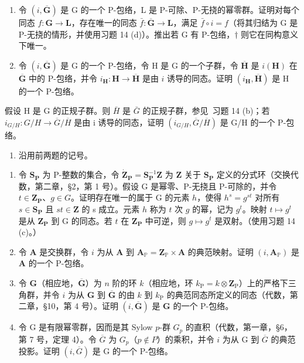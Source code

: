 \begin{enumerate}
\def\labelenumi{(\alph{enumi})}
\item
  令 \((i, \overline{\mathbf{G}})\) 是 G 的一个 P-包络，L 是 P-可除、P-无挠的幂零群。证明对每个同态 \(f\colon \mathbf{G} \to \mathbf{L}\)，存在唯一的同态 \(\bar{f}\colon \overline{\mathbf{G}} \to \mathbf{L}\)，满足 \(\bar{f} \circ i = f\)（将其归结为 G 是 P-无挠的情形，并使用习题 14 (d)）。推出若 G 有 P-包络，\(\dagger\) 则它在同构意义下唯一。
\item
  令 \((i, \overline{\mathbf{G}})\) 是 G 的一个 P-包络，令 H 是 G 的一个子群，令 \(\overline{\mathbf{H}}\) 是 \(i(\mathbf{H})\) 在 \(\overline{\mathbf{G}}\) 中的 P-包络，并令 \(i_{\mathbf{H}}: \mathbf{H} \to \overline{\mathbf{H}}\) 是由 \(i\) 诱导的同态。证明 \((i_{\mathbf{H}}, \overline{\mathbf{H}})\) 是 H 的一个 P-包络。
\end{enumerate}

假设 H 是 G 的正规子群。则 \(\bar{H}\) 是 \(\bar{G}\) 的正规子群，参见~习题 14 (b)；若 \(i_{G/H}: G/H \to \overline{G}/\overline{H}\) 是由 i 诱导的同态，证明 \((i_{G/H}, \overline{G}/\overline{H})\) 是 G/H 的一个 P-包络。

\begin{enumerate}
\def\labelenumi{\arabic{enumi}.}
\setcounter{enumi}{15}
\tightlist
\item
  沿用前两题的记号。
\end{enumerate}

\begin{enumerate}
\def\labelenumi{(\alph{enumi})}
\item
  令 \(\mathbf{S}_{\mathbf{P}}\) 为 P-整数的集合，令 \(\mathbf{\dot{Z}}_{\mathbf{P}} = \mathbf{S}_{\mathbf{P}}^{-1}\mathbf{Z}\) 为 \(\mathbf{Z}\) 关于 \(\mathbf{S}_{\mathbf{P}}\) 定义的分式环（交换代数，第二章，§2，第 1 号）。假设 G 是幂零、P-无挠且 P-可除的，并令 \(t \in \mathbf{Z}_{\mathbf{P}}\)、\(g \in G\)。证明存在唯一的属于 G 的元素 \(h\)，使得 \(h^s = g^{st}\) 对所有 \(s \in \mathbf{S}_{\mathbf{P}}\) 且 \(st \in \mathbf{Z}\) 的 s 成立。元素 \(h\) 称为 \(t\) 次 \(g\) 的幂，记为 \(g^t\)。映射 \(t \mapsto g^t\) 是从 \(\mathbf{Z}_{\mathbf{P}}\) 到 G 的同态。若 \(t\) 在 \(\mathbf{Z}_{\mathbf{P}}\) 中可逆，则 \(g \mapsto g^t\) 是双射。（使用习题 14 (c)。）
\item
  令 \(\mathbf{A}\) 是交换群，令 \(i\) 为从 \(\mathbf{A}\) 到 \(\mathbf{A}_{\mathbb{P}} = \mathbf{Z}_{\mathbb{P}} \times \mathbf{A}\) 的典范映射。证明 \((i, \mathbf{A}_{\mathbb{P}})\) 是 \(\mathbf{A}\) 的一个 P-包络。
\item
  令 \(\mathbf{G}\)（相应地，\(\overline{\mathbf{G}}\)）为 \(n\) 阶的环 \(k\)（相应地，环 \(k_{\mathrm{P}} = k\otimes \mathbf{Z}_{\mathrm{P}}\)）上的严格下三角群，并令 \(i\) 为从 \(\mathbf{G}\) 到 \(\overline{\mathbf{G}}\) 的由 \(k\) 到 \(k_{\mathrm{P}}\) 的典范同态所定义的同态（代数，第二章，§10，第 4 号）。证明 \((i,\overline{\mathbf{G}})\) 是 \(\mathbf{G}\) 的一个 P-包络。
\item
  令 G 是有限幂零群，因而是其 Sylow \(p\)-群 \(G_p\) 的直积（代数，第一章，§6，第 7 号，定理 4）。令 \(\overline{G}\) 为 \(G_p\)（\(p \notin P\)）的乘积，并令 \(i\) 为从 G 到 \(\overline{G}\) 的典范投影。证明 \((i, \overline{G})\) 是 G 的一个 P-包络。
\end{enumerate}

